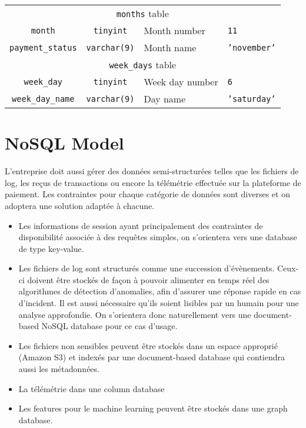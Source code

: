 \documentclass[11pt,a4paper,computermodern]{article}
\newcommand{\code}{\texttt}
\begin{document}
\begin{table}[ht]
\begin{threeparttable}
\begin{tabularx}{0.99\textwidth}{c c >{\centering\arraybackslash}X >{\centering\arraybackslash}X}
			\midrule
			\multicolumn{4}{c}{\code{months} table}\\
			\code{month} & \code{tinyint} & Month number & \code{11} \\
			\code{payment\_status} & \code{varchar(9)} & Month name & \code{'november'} \\
			
			\midrule
			\multicolumn{4}{c}{\code{week\_days} table}\\
			\code{week\_day} & \code{tinyint} & Week day number & \code{6} \\
			\code{week\_day\_name} & \code{varchar(9)} & Day name & \code{'saturday'} \\
			
			\bottomrule
		\end{tabularx}
	\end{threeparttable}
\end{table}


\section*{NoSQL Model}

L'entreprise doit aussi gérer des données semi-structurées telles que les fichiers de log, les reçus de transactions ou encore la télémétrie effectuée sur la plateforme de paiement. Les contraintes pour chaque catégorie de données sont diverses et on adoptera une solution adaptée à chacune.

\begin{itemize}
	\item Les informations de session ayant principalement des contraintes de disponibilité associée à des requêtes simples, on s'orientera vers une database de type key-value.
	\item Les fichiers de log sont structurés comme une succession d'évènements. Ceux-ci doivent être stockés de façon à pouvoir alimenter en temps réel des algorithmes de détection d'anomalies, afin d'assurer une réponse rapide en cas d'incident. Il est aussi nécessaire qu'ils soient lisibles par un humain pour une analyse approfondie. On s'orientera donc naturellement vers une document-based NoSQL database pour ce cas d'usage.
	\item Les fichiers non sensibles peuvent être stockés dans un espace approprié (Amazon S3) et indexés par une document-based database qui contiendra aussi les métadonnées.
	\item La télémétrie dans une column database
	\item Les features pour le machine learning peuvent être stockés dans une graph database.
\end{itemize}
\end{document}

